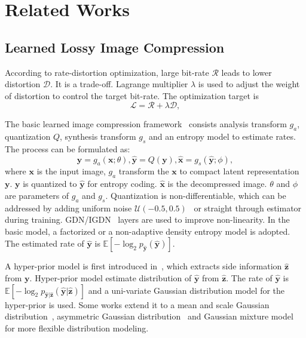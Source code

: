 \documentclass[sigconf]{acmart}
\begin{document}
\section{Related Works}\label{Sec:related}
\subsection{Learned Lossy Image Compression}
According to rate-distortion optimization, large bit-rate $\mathcal{R}$
leads to lower distortion $\mathcal{D}$.
It is a trade-off. Lagrange multiplier $\lambda$ is used to adjust the weight of
distortion to control the target bit-rate. The optimization target is
\begin{equation}\label{eq:rd}
    \mathcal{L} = \mathcal{R} + \lambda \mathcal{D},
\end{equation}\par
The basic learned image compression framework~\cite{balle2017end} consists
analysis transform $g_a$, quantization $Q$, synthesis transform $g_s$ and
an entropy model to estimate rates. The process can be formulated as:
\begin{equation}
    \boldsymbol{y} = g_a(\boldsymbol{x};\theta), \hat {\boldsymbol{y}} = Q(\boldsymbol{y}), \hat {\boldsymbol{x}} = g_s(\hat {\boldsymbol{y}};\phi),
\end{equation}
where $\boldsymbol x$ is the input image, $g_a$ transform the $\boldsymbol x$ to
compact latent representation $\boldsymbol y$. $\boldsymbol y$
is quantized to $\hat {\boldsymbol{y}}$ for entropy coding.
$\hat {\boldsymbol{x}}$ is the decompressed image.
$\theta$ and $\phi$ are parameters of $g_a$ and $g_s$.
Quantization is non-differentiable, which can be addressed by
adding uniform noise $\mathcal{U}(-0.5, 0.5)$~\cite{balle2017end} or
straight through estimator~\cite{DBLP:conf/iclr/TheisSCH17} during training.
GDN/IGDN~\cite{balle2016gdn} layers are used to improve non-linearity.
In the basic model, a factorized or
a non-adaptive density entropy model is adopted.
The estimated rate of $\hat {\boldsymbol{y}}$ is
$\mathbb{E}[-\log_2p_{\hat {\boldsymbol{y}}}(\hat {\boldsymbol{y}})]$.\par
A hyper-prior model is first introduced in~\cite{balle2018variational},
which extracts side information $\hat {\boldsymbol{z}}$ from $\boldsymbol y$.
Hyper-prior model estimate distribution of $\hat {\boldsymbol{y}}$ from
$\hat {\boldsymbol{z}}$. The rate of $\hat {\boldsymbol{y}}$ is
$\mathbb{E}[-\log_2p_{\hat {\boldsymbol{y}}|\hat {\boldsymbol{z}}}(\hat {\boldsymbol{y}}|\hat {\boldsymbol{z}})]$
and a uni-variate Gaussian distribution model for the hyper-prior is used.
Some works extend it to a mean and scale Gaussian distribution~\cite{DBLP:conf/nips/MinnenBT18},
asymmetric Gaussian distribution~\cite{DBLP:conf/cvpr/CuiWGGFB21} and
Gaussian mixture model~\cite{DBLP:conf/cvpr/ChengSTK20, DBLP:journals/corr/abs-2002-03370}
for more flexible distribution modeling.
\end{document}
